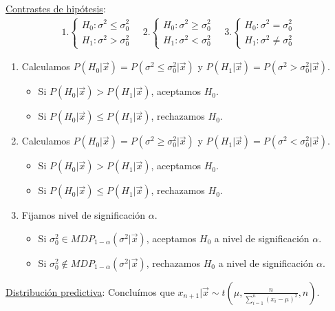 \\
\newline
\noindent \underline{Contrastes de hipótesis}:
\begin{align*}
   1. \begin{cases}
        H_0 : \sigma^2 \leq \sigma^2_0 \\
        H_1 : \sigma^2 > \sigma^2_0
    \end{cases} \quad     2.\begin{cases}
        H_0 : \sigma^2 \ge \sigma^2_0 \\
        H_1 : \sigma^2< \sigma^2_0
    \end{cases} \quad     3.\begin{cases}
        H_0 : \sigma^2 = \sigma^2_0 \\
        H_1 : \sigma^2\not = \sigma^2_0
    \end{cases}
\end{align*}

\begin{enumerate}
    \item Calculamos $P(H_0 | \vec{x}) = P(\sigma^2\leq \sigma^2_0 |\vec{x})$ y $P(H_1 | \vec{x}) = P(\sigma^2 > \sigma^2_0 | \vec{x})$.
    \begin{itemize}
        \item Si $P(H_0 | \vec{x}) > P(H_1 | \vec{x})$, aceptamos $H_0$.
        \item Si $P(H_0 | \vec{x}) \leq P(H_1 | \vec{x})$, rechazamos $H_0$.
    \end{itemize}
        \item Calculamos $P(H_0 | \vec{x}) = P(\sigma^2 \ge \sigma^2_0 |\vec{x})$ y $P(H_1 | \vec{x}) = P(\sigma^2< \sigma^2_0 | \vec{x})$.
    \begin{itemize}
        \item Si $P(H_0 | \vec{x}) > P(H_1 | \vec{x})$, aceptamos $H_0$.
        \item Si $P(H_0 | \vec{x}) \leq P(H_1 | \vec{x})$, rechazamos $H_0$.
    \end{itemize}
    \item Fijamos nivel de significación $\alpha$.
    \begin{itemize}
        \item Si $\sigma^2_0 \in MDP_{1 - \alpha}(\sigma^2 | \vec{x})$, aceptamos $H_0$ a nivel de significación $\alpha$.
        \item Si $\sigma^2_0 \not\in MDP_{1 - \alpha}(\sigma^2| \vec{x})$, rechazamos $H_0$ a nivel de significación $\alpha$.
    \end{itemize}
\end{enumerate}
\underline{Distribución predictiva}: Concluímos que $x_{n+1} | \vec{x} \sim t\left(\mu, \frac{n}{\sum_{i=1}^{n} (x_i - \mu)^2}, n \right)$.
